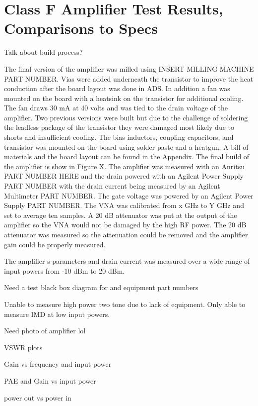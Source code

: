 ﻿\chapter{Class F Amplifier Test Results, Comparisons to Specs}

Talk about build process?

The final version of the amplifier was milled using INSERT MILLING MACHINE PART NUMBER. Vias were added underneath the transistor to improve the heat conduction after the board layout was done in ADS. In addition a fan was mounted on the board with a heatsink on the transistor for additional cooling. The fan draws 30 mA at 40 volts and was tied to the drain voltage of the amplifier. Two previous versions were built but due to the challenge of soldering the leadless package of the transistor they were damaged most likely due to shorts and insufficient cooling. The bias inductors, coupling capacitors, and transistor was mounted on the board using solder paste and a heatgun. A bill of materials and the board layout can be found in the Appendix. The final build of the amplifier is show in Figure X. The amplifier was measured with an Anritsu PART NUMBER HERE and the drain powered with an Agilent Power Supply PART NUMBER with the drain current being measured by an Agilent Multimeter PART NUMBER. The gate voltage was powered by an Agilent Power Supply PART NUMBER. The VNA was calibrated from x GHz to Y GHz and set to average ten samples. A 20 dB attenuator was put at the output of the amplifier so the VNA would not be damaged by the high RF power. The 20 dB attenuator was measured so the attenuation could be removed and the amplifier gain could be properly measured.

The amplifier s-parameters and drain current was measured over a wide range of input powers from -10 dBm to 20 dBm.

Need a test black box diagram for and equipment part numbers

Unable to measure high power two tone due to lack of equipment. Only able to measure IMD at low input powers.

Need photo of amplifier lol 

VSWR plots

Gain vs frequency and input power

PAE and Gain vs input power

power out vs power in
